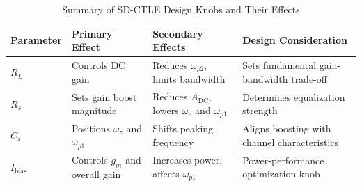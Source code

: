 \begin{table}[H]
\centering
\begin{tabular}{ >{\raggedright\arraybackslash}p{} 
                 >{\raggedright\arraybackslash}p{} 
                 >{\raggedright\arraybackslash}p{} 
                 >{\raggedright\arraybackslash}p{} }
\toprule
\textbf{Parameter  } & \textbf{Primary Effect} & \textbf{Secondary Effects} & \textbf{Design Consideration} \\
\midrule
$R_L$ 
    & Controls DC gain 
    & Reduces $\omega_{p2}$, limits bandwidth 
    & Sets fundamental gain-bandwidth trade-off \\
\midrule
$R_s$ 
    & Sets gain boost magnitude 
    & Reduces $A_{\text{DC}}$, lowers $\omega_z$ and $\omega_{p1}$ 
    & Determines equalization strength \\
\midrule
$C_s$ 
    & Positions $\omega_z$ and $\omega_{p1}$ 
    & Shifts peaking frequency 
    & Aligns boosting with channel characteristics \\
\midrule
$I_{\text{bias}}$ 
    & Controls $g_m$ and overall gain 
    & Increases power, affects $\omega_{p1}$ 
    & Power-performance optimization knob \\
\bottomrule
\end{tabular}
\caption{Summary of SD-CTLE Design Knobs and Their Effects}
\label{tab:design_knobs_summary}
\end{table}

